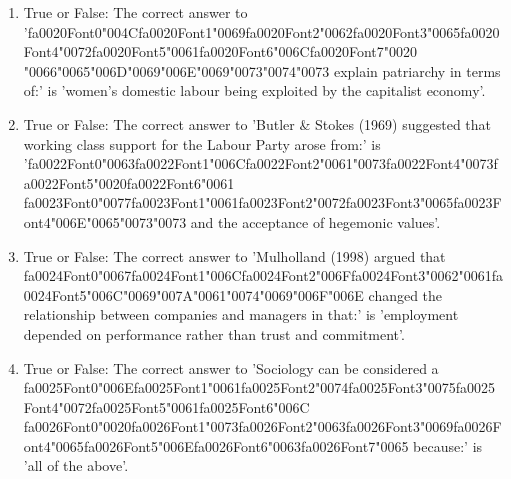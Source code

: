 \documentclass[12pt]{article}
\begin{document}
\begin{enumerate}[label=\arabic*.]
\item True or False: The correct answer to '{\csname fa0020Font0\endcsname\char"004C}{\csname fa0020Font1\endcsname\char"0069}{\csname fa0020Font2\endcsname\char"0062}{\csname fa0020Font3\endcsname\char"0065}{\csname fa0020Font4\endcsname\char"0072}{\csname fa0020Font5\endcsname\char"0061}{\csname fa0020Font6\endcsname\char"006C}{\csname fa0020Font7\endcsname\char"0020} {\char"0066}{\char"0065}{\char"006D}{\char"0069}{\char"006E}{\char"0069}{\char"0073}{\char"0074}{\char"0073} explain patriarchy in terms of:' is 'women's domestic labour being exploited by the capitalist economy'.
\item True or False: The correct answer to 'Butler \& Stokes (1969) suggested that working class support for the Labour Party arose from:' is '{\csname fa0022Font0\endcsname\char"0063}{\csname fa0022Font1\endcsname\char"006C}{\csname fa0022Font2\endcsname\char"0061}{\char"0073}{\csname fa0022Font4\endcsname\char"0073}{\csname fa0022Font5\endcsname\char"0020}{\csname fa0022Font6\endcsname\char"0061} {\csname fa0023Font0\endcsname\char"0077}{\csname fa0023Font1\endcsname\char"0061}{\csname fa0023Font2\endcsname\char"0072}{\csname fa0023Font3\endcsname\char"0065}{\csname fa0023Font4\endcsname\char"006E}{\char"0065}{\char"0073}{\char"0073} and the acceptance of hegemonic values'.
\item True or False: The correct answer to 'Mulholland (1998) argued that {\csname fa0024Font0\endcsname\char"0067}{\csname fa0024Font1\endcsname\char"006C}{\csname fa0024Font2\endcsname\char"006F}{\csname fa0024Font3\endcsname\char"0062}{\char"0061}{\csname fa0024Font5\endcsname\char"006C}{\char"0069}{\char"007A}{\char"0061}{\char"0074}{\char"0069}{\char"006F}{\char"006E} changed the relationship between companies and managers in that:' is 'employment depended on performance rather than trust and commitment'.
\item True or False: The correct answer to 'Sociology can be considered a {\csname fa0025Font0\endcsname\char"006E}{\csname fa0025Font1\endcsname\char"0061}{\csname fa0025Font2\endcsname\char"0074}{\csname fa0025Font3\endcsname\char"0075}{\csname fa0025Font4\endcsname\char"0072}{\csname fa0025Font5\endcsname\char"0061}{\csname fa0025Font6\endcsname\char"006C} {\csname fa0026Font0\endcsname\char"0020}{\csname fa0026Font1\endcsname\char"0073}{\csname fa0026Font2\endcsname\char"0063}{\csname fa0026Font3\endcsname\char"0069}{\csname fa0026Font4\endcsname\char"0065}{\csname fa0026Font5\endcsname\char"006E}{\csname fa0026Font6\endcsname\char"0063}{\csname fa0026Font7\endcsname\char"0065} because:' is 'all of the above'.

\end{enumerate}
\end{document}
